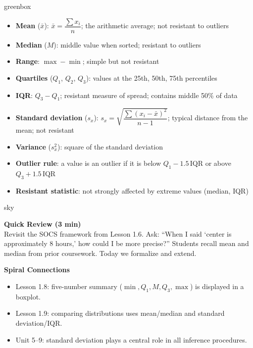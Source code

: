 \documentclass[10pt]{article}
\begin{document}
\begin{skillbox}{greenbox}
\begin{minipage}[t]{0.48\linewidth}
    \begin{itemize}
        \item \textbf{Mean} ($\bar{x}$): $\bar{x} = \dfrac{\sum x_i}{n}$; the arithmetic average; not resistant to outliers
        \item \textbf{Median} ($M$): middle value when sorted; resistant to outliers
        \item \textbf{Range}: $\max - \min$; simple but not resistant
        \item \textbf{Quartiles} ($Q_1$, $Q_2$, $Q_3$): values at the 25th, 50th, 75th percentiles
        \item \textbf{IQR}: $Q_3 - Q_1$; resistant measure of spread; contains middle 50\% of data
    \end{itemize}
\end{minipage}
\hfill
\begin{minipage}[t]{0.48\linewidth}
    \begin{itemize}
        \item \textbf{Standard deviation} ($s_x$): $s_x = \sqrt{\dfrac{\sum(x_i - \bar{x})^2}{n-1}}$; typical distance from the mean; not resistant
        \item \textbf{Variance} ($s_x^2$): square of the standard deviation
        \item \textbf{Outlier rule}: a value is an outlier if it is below $Q_1 - 1.5\,\text{IQR}$ or above $Q_3 + 1.5\,\text{IQR}$
        \item \textbf{Resistant statistic}: not strongly affected by extreme values (median, IQR)
    \end{itemize}
\end{minipage}
\end{skillbox}

\begin{skillbox}{sky}
\begin{minipage}[t]{0.48\linewidth}
    \textbf{Quick Review (3 min)}\\
    Revisit the SOCS framework from Lesson 1.6. Ask: ``When I said `center is approximately 8 hours,' how could I be more precise?'' Students recall mean and median from prior coursework. Today we formalize and extend.
\end{minipage}
\hfill
\begin{minipage}[t]{0.48\linewidth}
    \textbf{Spiral Connections}
    \begin{itemize}
        \item Lesson 1.8: five-number summary ($\min, Q_1, M, Q_3, \max$) is displayed in a boxplot.
        \item Lesson 1.9: comparing distributions uses mean/median and standard deviation/IQR.
        \item Unit 5--9: standard deviation plays a central role in all inference procedures.
    \end{itemize}
\end{minipage}
\end{skillbox}
\end{document}
